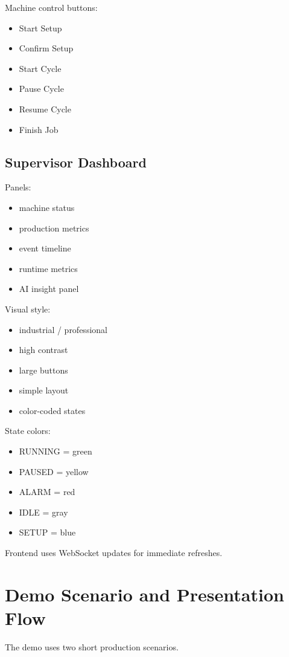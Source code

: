 \documentclass[11pt]{article}
\begin{document}
Machine control buttons:
\begin{itemize}
\item Start Setup
\item Confirm Setup
\item Start Cycle
\item Pause Cycle
\item Resume Cycle
\item Finish Job
\end{itemize}

\subsection{Supervisor Dashboard}
Panels:
\begin{itemize}
\item machine status
\item production metrics
\item event timeline
\item runtime metrics
\item AI insight panel
\end{itemize}

Visual style:
\begin{itemize}
\item industrial / professional
\item high contrast
\item large buttons
\item simple layout
\item color-coded states
\end{itemize}

State colors:
\begin{itemize}
\item RUNNING = green
\item PAUSED = yellow
\item ALARM = red
\item IDLE = gray
\item SETUP = blue
\end{itemize}

Frontend uses WebSocket updates for immediate refreshes.

\section{Demo Scenario and Presentation Flow}
The demo uses two short production scenarios.
\end{document}
